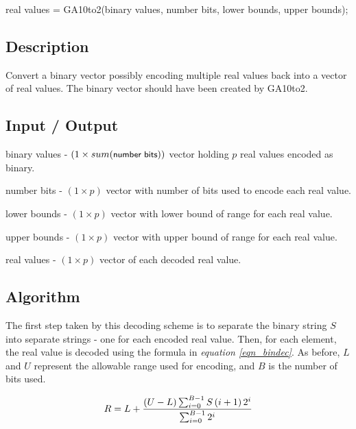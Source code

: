 \documentclass{book}
\newcommand{\textcode}[1]{\textsf{\small #1}}   %
\begin{document}
\textcode{real values = GA10to2(binary values, number bits,
lower bounds, upper bounds);}

\subsection*{Description}

Convert a binary vector possibly encoding multiple real values
back into a vector of real values. The binary vector should
have been created by \textcode{GA10to2}.

\subsection*{Input / Output}

\begin{compactitem}

\item \textcode{binary values} - $\left(1 \times sum(\textcode{number bits}) \right)$ vector holding $p$ real values encoded as binary.

\item \textcode{number bits} - $\left( 1 \times p \right)$ vector with number of bits used to encode each real value.

\item \textcode{lower bounds} - $\left( 1 \times p \right)$ vector with lower bound of range for each real value.

\item \textcode{upper bounds} - $\left( 1 \times p \right)$ vector with upper bound of range for each real value.

\item \textcode{real values} - $\left( 1 \times p \right)$ vector of each decoded real value.

\end{compactitem}

\subsection*{Algorithm}

The first step taken by this decoding scheme is to separate the binary
string $S$ into separate strings - one for each encoded real value. Then,
for each element, the real value is decoded using the formula in \emph{%
equation \ref{eqn_bindec}}. As before, $L$ and $U$ represent the allowable
range used for encoding, and $B$ is the number of bits used.

\begin{equation}
R=L+\frac{\left( U-L\right) \sum_{i=0}^{B-1}S\left( i+1\right) 2^{i}}{%
\sum_{i=0}^{B-1}2^{i}}  \label{eqn_bindec}
\end{equation}
\end{document}
